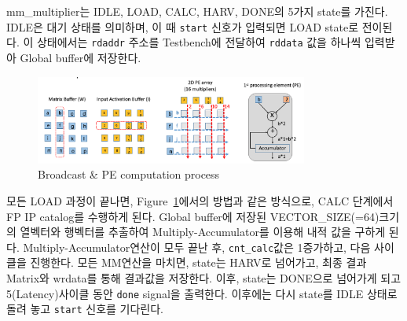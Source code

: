 \documentclass{article}
\begin{document}
mm\_multiplier는 IDLE, LOAD, CALC, HARV, DONE의 5가지 state를 가진다. IDLE은 대기 상태를 의미하며, 이 때 \texttt{start} 신호가 입력되면 LOAD state로 전이된다. 이 상태에서는 \texttt{rdaddr} 주소를 Testbench에 전달하여 \texttt{rddata} 값을 하나씩 입력받아 Global buffer에 저장한다.

\newpage
\begin{figure}[ht]
	\centering
	\includegraphics[width=0.8\textwidth]{fig/broadcast_mm.png}
\caption{Broadcast \& PE computation process}
\label{fig3}
\end{figure}
모든 LOAD 과정이 끝나면, Figure~\ref{fig3}에서의 방법과 같은 방식으로, CALC 단계에서 FP IP catalog를 수행하게 된다. Global buffer에 저장된 VECTOR\_SIZE(=64)크기의 열벡터와 행벡터를 추출하여 Multiply-Accumulator를 이용해 내적 값을 구하게 된다. Multiply-Accumulator연산이 모두 끝난 후, \texttt{cnt\_calc}값은 1증가하고, 다음 사이클을 진행한다. 모든 MM연산을 마치면, state는 HARV로 넘어가고, 최종 결과 Matrix와 wrdata를 통해 결과값을 저장한다. 이후, state는 DONE으로 넘어가게 되고 5(Latency)사이클 동안 \texttt{done} signal을 출력한다. 이후에는 다시 state를 IDLE 상태로 돌려 놓고 \texttt{start} 신호를 기다린다.\\
\end{document}
